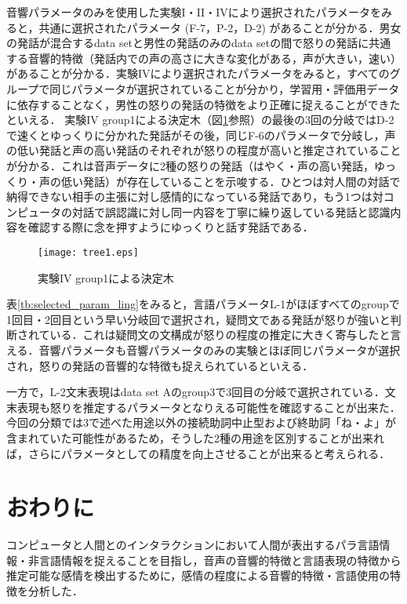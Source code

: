 \documentclass[japanese]{jnlp_1.3c}
\begin{document}
音響パラメータのみを使用した実験I・II・IVにより選択されたパラメータをみると，共通に選択されたパラメータ (F-7，P-2，D-2) があることが分かる．男女の発話が混合するdata setと男性の発話のみのdata setの間で怒りの発話に共通する音響的特徴（発話内での声の高さに大きな変化がある，声が大きい，速い）があることが分かる．実験IVにより選択されたパラメータをみると，すべてのグループで同じパラメータが選択されていることが分かり，学習用・評価用データに依存することなく，男性の怒りの発話の特徴をより正確に捉えることができたといえる．
実験IV group1による決定木（図\ref{fig:tree}参照）の最後の3回の分岐ではD-2で速くとゆっくりに分かれた発話がその後，同じF-6のパラメータで分岐し，声の低い発話と声の高い発話のそれぞれが怒りの程度が高いと推定されていることが分かる．これは音声データに2種の怒りの発話（はやく・声の高い発話，ゆっくり・声の低い発話）が存在していることを示唆する．ひとつは対人間の対話で納得できない相手の主張に対し感情的になっている発話であり，もう1つは対コンピュータの対話で誤認識に対し同一内容を丁寧に繰り返している発話と認識内容を確認する際に念を押すようにゆっくりと話す発話である．

\begin{figure}[t]
\begin{center}
    \texttt{[image: tree1.eps]}
\caption{実験IV group1による決定木}
\label{fig:tree}
\end{center} 
\end{figure} 



表\ref{tb:selected_param_ling}をみると，言語パラメータL-1がほぼすべてのgroupで1回目・2回目という早い分岐回で選択され，疑問文である発話が怒りが強いと判断されている．これは疑問文の文構成が怒りの程度の推定に大きく寄与したと言える．音響パラメータも音響パラメータのみの実験とほぼ同じパラメータが選択され，怒りの発話の音響的な特徴も捉えられているといえる．

一方で，L-2文末表現はdata set Aのgroup3で3回目の分岐で選択されている．文末表現も怒りを推定するパラメータとなりえる可能性を確認することが出来た．今回の分類では3で述べた用途以外の接続助詞中止型および終助詞「ね・よ」が含まれていた可能性があるため，そうした2種の用途を区別することが出来れば，さらにパラメータとしての精度を向上させることが出来ると考えられる．

\section{おわりに}
コンピュータと人間とのインタラクションにおいて人間が表出するパラ言語情報・非言語情報を捉えることを目指し，音声の音響的特徴と言語表現の特徴から推定可能な感情を検出するために，感情の程度による音響的特徴・言語使用の特徴を分析した．
\end{document}
